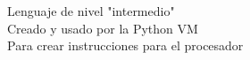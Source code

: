 \documentclass[preview]{standalone}
\begin{document}
Lenguaje de nivel "intermedio"\\Creado y usado por la Python VM\\Para crear instrucciones para el procesador\\
\end{document}
